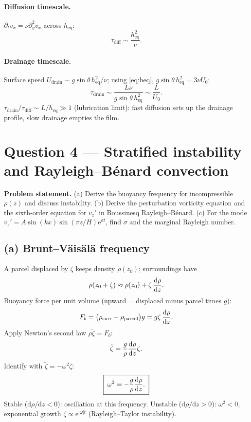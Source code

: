 \documentclass[11pt]{article}
\newcommand{\de}{\mathrm{d}}
\begin{document}
\paragraph{Diffusion timescale.} $\partial_t v_x = \nu\partial_y^2 v_x$ across $h_{\text{eq}}$:
\begin{equation}
\boxed{\;\tau_{\text{diff}} \sim \frac{h_{\text{eq}}^2}{\nu}.\;}
\end{equation}

\paragraph{Drainage timescale.} Surface speed $U_{\text{drain}}\sim g\sin\theta\,h_{\text{eq}}^2/\nu$; using \eqref{eq:heq}, $g\sin\theta\,h_{\text{eq}}^2 = 3\nu U_0$:
\begin{equation}
\boxed{\;\tau_{\text{drain}} \sim \frac{L\nu}{g\sin\theta\,h_{\text{eq}}^2} \sim \frac{L}{U_0}.\;}
\end{equation}
$\tau_{\text{drain}}/\tau_{\text{diff}} \sim L/h_{\text{eq}}\gg 1$ (lubrication limit): fast diffusion sets up the drainage profile, slow drainage empties the film.

\section*{Question 4 --- Stratified instability and Rayleigh--B\'enard convection}

\textbf{Problem statement.} (a) Derive the buoyancy frequency for incompressible $\rho(z)$ and discuss instability. (b) Derive the perturbation vorticity equation and the sixth-order equation for $v_z'$ in Boussinesq Rayleigh--B\'enard. (c) For the mode $v_z'=A\sin(kx)\sin(\pi z/H)\mathrm{e}^{\sigma t}$, find $\sigma$ and the marginal Rayleigh number.

\subsection*{(a) Brunt--V\"ais\"al\"a frequency}

A parcel displaced by $\zeta$ keeps density $\rho(z_0)$; surroundings have
\[ \rho(z_0+\zeta) \approx \rho(z_0)+\zeta\,\dv{\rho}{z}. \]
Buoyancy force per unit volume (upward = displaced minus parcel times $g$):
\[ F_b = \big(\rho_{\text{surr}}-\rho_{\text{parcel}}\big)g = g\zeta\,\dv{\rho}{z}. \]
Apply Newton's second law $\rho\ddot\zeta = F_b$:
\[ \ddot\zeta = \frac{g}{\rho}\dv{\rho}{z}\zeta. \]
Identify with $\ddot\zeta = -\omega^2\zeta$:
\begin{equation}
\boxed{\;\omega^2 = -\frac{g}{\rho}\dv{\rho}{z}.\;}
\end{equation}
Stable ($\de\rho/\de z<0$): oscillation at this frequency. Unstable ($\de\rho/\de z>0$): $\omega^2<0$, exponential growth $\zeta\propto\mathrm{e}^{|\omega|t}$ (Rayleigh--Taylor instability).
\end{document}
